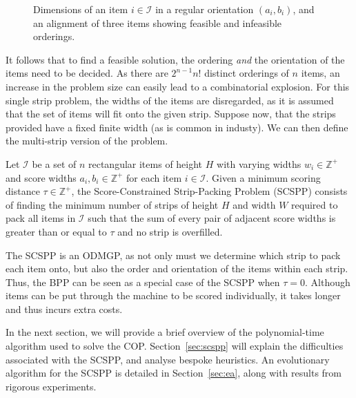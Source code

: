 \documentclass{elsarticle}
\begin{document}
\begin{figure}[H]	
	\centering
	
	\caption{Dimensions of an item $i \in \mathcal{I}$ in a regular orientation $(a_i, b_i)$, and an alignment of three items showing feasible and infeasible orderings.}	
	\label{fig:itemsknife}
\end{figure}


It follows that to find a feasible solution, the ordering \emph{and} the orientation of the items need to be decided. As there are $2^{n-1} n!$ distinct orderings of $n$ items, an increase in the problem size can easily lead to a combinatorial explosion. For this single strip problem, the widths of the items are disregarded, as it is assumed that the set of items will fit onto the given strip. Suppose now, that the strips provided have a fixed finite width (as is common in industy). We can then define the multi-strip version of the problem.

\begin{definition}
	\label{defn:scspp}
	Let $\mathcal{I}$ be a set of $n$ rectangular items of height $H$ with varying widths $w_i \in \mathbb{Z}^+$ and score widths $a_i, b_i \in \mathbb{Z}^+$ for each item $i \in \mathcal{I}$. Given a minimum scoring distance $\tau \in \mathbb{Z}^+$, the Score-Constrained Strip-Packing Problem (SCSPP) consists of finding the minimum number of strips of height $H$ and width $W$ required to pack all items in $\mathcal{I}$ such that the sum of every pair of adjacent score widths is greater than or equal to $\tau$ and no strip is overfilled.
\end{definition}

The SCSPP is an ODMGP, as not only must we determine which strip to pack each item onto, but also the order and orientation of the items within each strip. Thus, the BPP can be seen as a special case of the SCSPP when $\tau = 0$. Although items can be put through the machine to be scored individually, it takes longer and thus incurs extra costs.


In the next section, we will provide a brief overview of the polynomial-time algorithm used to solve the COP. Section~\ref{sec:scspp} will explain the difficulties associated with the SCSPP, and analyse bespoke heuristics. An evolutionary algorithm for the SCSPP is detailed in Section~\ref{sec:ea}, along with results from rigorous experiments.  
\end{document}
